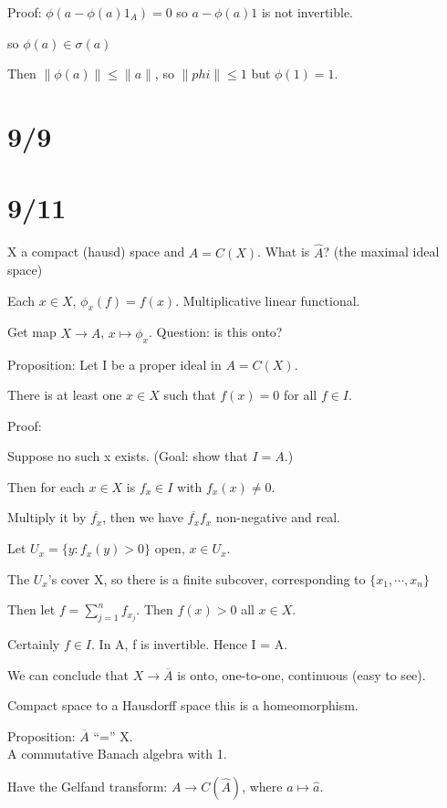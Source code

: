 \documentclass[12pt]{article}
\begin{document}
Proof: $\phi(a - \phi(a)1_A) = 0$ so $a - \phi(a)1$ is not invertible.

so $\phi(a) \in \sigma(a)$

Then $\|\phi(a)\| \leq \|a\|$, so $\|phi\| \leq 1$ but $\phi(1) = 1$.

\section{9/9}

\section{9/11}

X a compact (hausd) space and $A = C(X)$.  What is $\hat{A}$? (the maximal ideal space)

Each $x \in X$, $\phi_x(f) = f(x)$.  Multiplicative linear functional.

Get map $X \to \hat{A}$, $x \mapsto \phi_x$.  Question: is this onto?

\noindent
Proposition: Let I be a proper ideal in $A = C(X)$.

There is at least one $x \in X$ such that $f(x) = 0$ for all $f \in I$.

\noindent
Proof:

Suppose no such x exists. (Goal: show that $I = A$.)

Then for each $x \in X$ is $f_x \in I$ with $f_x(x) \neq 0$.

Multiply it by $\overline{f_x}$, then we have $\overline{f_x}f_x$ non-negative and real.

Let $U_x = \{y : f_x(y) > 0 \}$ open, $x \in U_x$.

The $U_x$'s cover X, so there is a finite subcover, corresponding to $\{x_1, \cdots, x_n\}$

Then let $f = \sum_{j = 1}^nf_{x_j}$.  Then $f(x) > 0$ all $x \in X$.

Certainly $f \in I$.  In A, f is invertible.  Hence I = A.

\noindent
We can conclude that $X \to \overline{A}$ is onto, one-to-one, continuous (easy to see).

Compact space to a Hausdorff space this is a homeomorphism.

\noindent
Proposition: $\overline{A}$ ``='' X.\\

\noindent
A commutative Banach algebra with 1.

Have the Gelfand transform: $A \to C(\hat{A})$, where $a \mapsto \hat{a}$.
\end{document}
